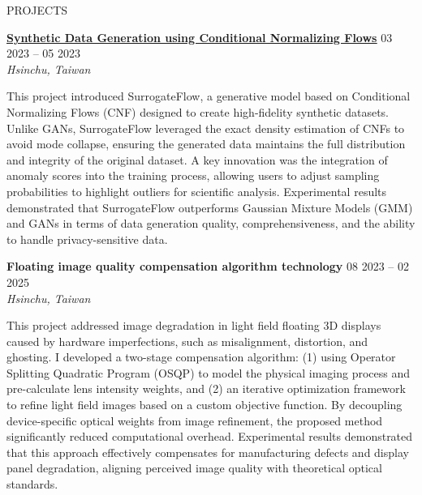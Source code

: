 \documentclass{resume}
\begin{document}
\begin{rSection}{PROJECTS}
    \item \textbf{\href{https://drive.google.com/file/d/176xCWH6j0VAuoXLtB_HppxyZN-6ezq9_/view?usp=drive_link}{\textbf{\large{\underline{Synthetic Data Generation using Conditional Normalizing Flows}}}}} \hfill {03 2023 -- 05 2023}\\
    \mbox{} \hfill \textit{Hsinchu, Taiwan}

    This project introduced SurrogateFlow, a generative model based on Conditional Normalizing Flows (CNF) designed to create high-fidelity synthetic datasets. 
    Unlike GANs, SurrogateFlow leveraged the exact density estimation of CNFs to avoid mode collapse, ensuring the generated data maintains the full distribution and integrity of the original dataset. 
    A key innovation was the integration of anomaly scores into the training process, allowing users to adjust sampling probabilities to highlight outliers for scientific analysis. 
    Experimental results demonstrated that SurrogateFlow outperforms Gaussian Mixture Models (GMM) and GANs in terms of data generation quality, comprehensiveness, and the ability to handle privacy-sensitive data.

    \item \textbf{Floating image quality compensation algorithm technology} \hfill {08 2023 -- 02 2025}\\
    \mbox{} \hfill \textit{Hsinchu, Taiwan}

    This project addressed image degradation in light field floating 3D displays caused by hardware imperfections, such as misalignment, distortion, and ghosting. 
    I developed a two-stage compensation algorithm: (1) using Operator Splitting Quadratic Program (OSQP) to model the physical imaging process and pre-calculate lens intensity weights, and 
    (2) an iterative optimization framework to refine light field images based on a custom objective function. 
    By decoupling device-specific optical weights from image refinement, the proposed method significantly reduced computational overhead. 
    Experimental results demonstrated that this approach effectively compensates for manufacturing defects and display panel degradation, 
    aligning perceived image quality with theoretical optical standards.
\end{rSection}

\newpage
\end{document}
